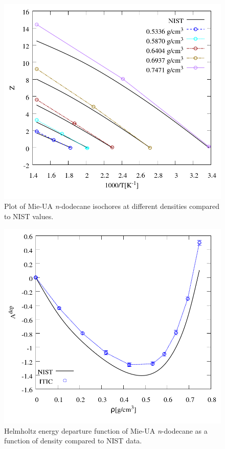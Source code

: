 \documentclass[%
 aip,
 jcp,
 sd,%
 amsmath,amssymb,
]{revtex4-1}
\begin{document}

\begin{figure}[!htbp]
\includegraphics[scale=0.35]{Figures/EXAMPLE-SIM_Mie-C12_zt.png}
\caption{Plot of Mie-UA \textit{n}-dodecane isochores at different densities compared to NIST values.}
\label{fig:EXAMPLE-SIM/Mie-C12/zt}
\end{figure}

\begin{figure}[!htbp]
\includegraphics[scale=0.35]{Figures/EXAMPLE-SIM_Mie-C12_adep.png}
\caption{Helmholtz energy departure function of Mie-UA \textit{n}-dodecane as a function of density compared to NIST data.}
\label{fig:EXAMPLE-SIM/Mie-C12/adep}
\end{figure}
\end{document}
